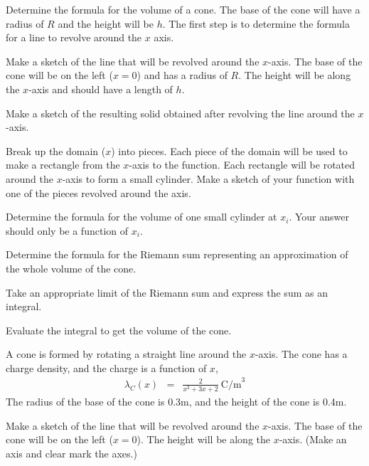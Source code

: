 \begin{problem}
\item Determine the formula for the volume of a cone.
    The base of the cone will have a radius of $R$ and the height will be $h$.
    The first step is to determine the formula for a line to revolve around the $x$ axis.
  \begin{subproblem}
  \item Make a sketch of the line that will be revolved around the
    $x$-axis.  The base of the cone will be on the left ($x=0$) and
    has a radius of $R$.  The height will be along the $x$-axis and
    should have a length of $h$.  
    \vfill

    \item Make a sketch of the resulting solid obtained after
      revolving the line around the $x$-axis.
      \vfill

    \item Break up the domain ($x$) into pieces. Each piece of the
      domain will be used to make a rectangle from the $x$-axis to the
      function. Each rectangle will be rotated around the $x$-axis to
      form a small cylinder.  Make a sketch of your function with one
      of the pieces revolved around the axis.  \vfill

    \clearpage

    \item Determine the formula for the volume of one small cylinder at $x_i$. Your answer should only be a function of $x_i$.
      \vfill

    \item Determine the formula for the Riemann sum representing an
      approximation of the whole volume of the cone.
      \vfill

    \item Take an appropriate limit of the Riemann sum and express the sum as an integral.
      \vfill

    \item Evaluate the integral to get the volume of the cone.
      \vfill

  \end{subproblem}

  \clearpage

  \item A cone is formed by rotating a straight line around the $x$-axis.
     The cone has a charge density, and the charge is a function of $x$,
     \begin{eqnarray*}
       \lambda_C(x) & = & \frac{2}{x^2+3x+2} ~ \mathrm{C/m}^3
     \end{eqnarray*}
     The radius of the base of the cone is 0.3m, and the height of the cone is 0.4m.
     \begin{subproblem}
       \item
         Make a sketch of the line that will be revolved around the $x$-axis.
         The base of the cone will be on the left ($x=0$).
         The height will be along the $x$-axis.
         (Make an axis and clear mark the axes.)
         \vfill


\end{subproblem}
\end{problem}
